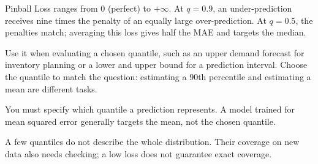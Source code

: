 \begin{metricformula}
\end{metricformula}

Pinball Loss ranges from $0$ (perfect) to $+\infty$. At $q=0.9$, an under-prediction receives nine times the penalty of an equally large over-prediction. At $q=0.5$, the penalties match; averaging this loss gives half the MAE and targets the median.


Use it when evaluating a chosen quantile, such as an upper demand forecast for inventory planning or a lower and upper bound for a prediction interval. Choose the quantile to match the question: estimating a $90$th percentile and estimating a mean are different tasks.

{
    \item You must specify which quantile a prediction represents. A model trained for mean squared error generally targets the mean, not the chosen quantile.
    \item A few quantiles do not describe the whole distribution. Their coverage on new data also needs checking; a low loss does not guarantee exact coverage.
}


